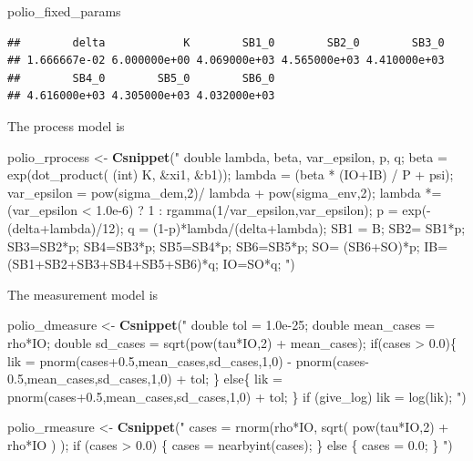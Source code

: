 \documentclass[]{article}
\newenvironment{Shaded}{\begin{snugshade}}{\end{snugshade}}
\newcommand{\KeywordTok}[1]{\textcolor[rgb]{0.13,0.29,0.53}{\textbf{#1}}}
\newcommand{\StringTok}[1]{\textcolor[rgb]{0.31,0.60,0.02}{#1}}
\newcommand{\NormalTok}[1]{#1}
\begin{document}
\begin{Shaded}
\begin{Highlighting}[]
\NormalTok{polio_fixed_params}
\end{Highlighting}
\end{Shaded}

\begin{verbatim}
##        delta            K        SB1_0        SB2_0        SB3_0 
## 1.666667e-02 6.000000e+00 4.069000e+03 4.565000e+03 4.410000e+03 
##        SB4_0        SB5_0        SB6_0 
## 4.616000e+03 4.305000e+03 4.032000e+03
\end{verbatim}

The process model is

\begin{Shaded}
\begin{Highlighting}[]
\NormalTok{polio_rprocess <-}\StringTok{ }\KeywordTok{Csnippet}\NormalTok{(}\StringTok{"}
\StringTok{  double lambda, beta, var_epsilon, p, q;}
\StringTok{ }
\StringTok{  beta = exp(dot_product( (int) K, &xi1, &b1));}
\StringTok{  lambda = (beta * (IO+IB) / P + psi);}
\StringTok{  var_epsilon = pow(sigma_dem,2)/ lambda +  pow(sigma_env,2);}
\StringTok{  lambda *= (var_epsilon < 1.0e-6) ? 1 : rgamma(1/var_epsilon,var_epsilon);}
\StringTok{  p = exp(- (delta+lambda)/12);}
\StringTok{  q = (1-p)*lambda/(delta+lambda);}
\StringTok{  SB1 = B;}
\StringTok{  SB2= SB1*p;}
\StringTok{  SB3=SB2*p;}
\StringTok{  SB4=SB3*p;}
\StringTok{  SB5=SB4*p;}
\StringTok{  SB6=SB5*p;}
\StringTok{  SO= (SB6+SO)*p;}
\StringTok{  IB=(SB1+SB2+SB3+SB4+SB5+SB6)*q;}
\StringTok{  IO=SO*q;}
\StringTok{"}\NormalTok{)}
\end{Highlighting}
\end{Shaded}

The measurement model is

\begin{Shaded}
\begin{Highlighting}[]
\NormalTok{polio_dmeasure <-}\StringTok{ }\KeywordTok{Csnippet}\NormalTok{(}\StringTok{"}
\StringTok{  double tol = 1.0e-25;}
\StringTok{  double mean_cases = rho*IO;}
\StringTok{  double sd_cases = sqrt(pow(tau*IO,2) + mean_cases);}
\StringTok{  if(cases > 0.0)\{}
\StringTok{    lik = pnorm(cases+0.5,mean_cases,sd_cases,1,0) - pnorm(cases-0.5,mean_cases,sd_cases,1,0) + tol; }
\StringTok{  \} else\{}
\StringTok{    lik = pnorm(cases+0.5,mean_cases,sd_cases,1,0) + tol;}
\StringTok{  \}}
\StringTok{  if (give_log) lik = log(lik);}
\StringTok{"}\NormalTok{)}

\NormalTok{polio_rmeasure <-}\StringTok{ }\KeywordTok{Csnippet}\NormalTok{(}\StringTok{"}
\StringTok{  cases = rnorm(rho*IO, sqrt( pow(tau*IO,2) + rho*IO ) );}
\StringTok{  if (cases > 0.0) \{}
\StringTok{    cases = nearbyint(cases);}
\StringTok{  \} else \{}
\StringTok{    cases = 0.0;}
\StringTok{  \}}
\StringTok{"}\NormalTok{)}
\end{Highlighting}
\end{Shaded}
\end{document}
